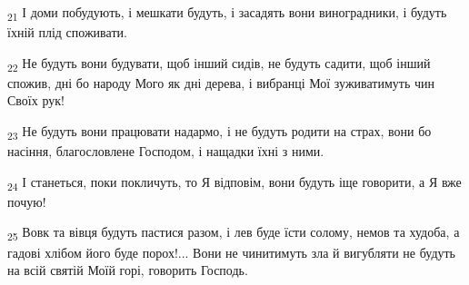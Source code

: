 \begin{tcolorbox}
\textsubscript{21} І доми побудують, і мешкати будуть, і засадять вони виноградники, і будуть їхній плід споживати.
\end{tcolorbox}
\begin{tcolorbox}
\textsubscript{22} Не будуть вони будувати, щоб інший сидів, не будуть садити, щоб інший спожив, дні бо народу Мого як дні дерева, і вибранці Мої зуживатимуть чин Своїх рук!
\end{tcolorbox}
\begin{tcolorbox}
\textsubscript{23} Не будуть вони працювати надармо, і не будуть родити на страх, вони бо насіння, благословлене Господом, і нащадки їхні з ними.
\end{tcolorbox}
\begin{tcolorbox}
\textsubscript{24} І станеться, поки покличуть, то Я відповім, вони будуть іще говорити, а Я вже почую!
\end{tcolorbox}
\begin{tcolorbox}
\textsubscript{25} Вовк та вівця будуть пастися разом, і лев буде їсти солому, немов та худоба, а гадові хлібом його буде порох!... Вони не чинитимуть зла й вигубляти не будуть на всій святій Моїй горі, говорить Господь.
\end{tcolorbox}
